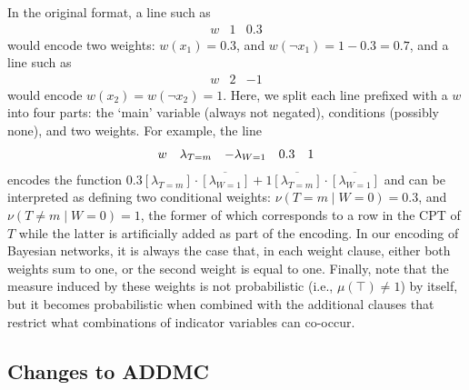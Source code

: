 In the original format, a line such as
\[
  \begin{array}{lrrll}
    w &1 &0.3
  \end{array}
\]
would encode two weights: $w(x_{1}) = 0.3$, and $w(\neg x_{1}) = 1 - 0.3 = 0.7$,
and a line such as
\[
  \begin{array}{lrrll}
    w &2 &-1
  \end{array}
\]
would encode $w(x_{2}) = w(\neg x_{2}) = 1$. Here, we split each line prefixed
with a $w$ into four parts: the `main' variable (always not negated), conditions
(possibly none), and two weights. For example, the line
\[
  \begin{array}{lrrll}
    w &\lambda\sb{T=m} &-\lambda\sb{W=1} &0.3 &1
  \end{array}
\]
encodes the function $0.3[\lambda_{T=m}] \cdot \overline{[\lambda_{W=1}]} +
1\overline{[\lambda_{T=m}]} \cdot \overline{[\lambda_{W=1}]}$ and can be
interpreted as defining two conditional weights: $\nu(T = m \mid W = 0) = 0.3$,
and $\nu(T \ne m \mid W = 0) = 1$, the former of which corresponds to a row in
the CPT of $T$ while the latter is artificially added as part of the encoding.
In our encoding of Bayesian networks, it is always the case that, in each weight
clause, either both weights sum to one, or the second weight is equal to one.
Finally, note that the measure induced by these weights is not probabilistic
(i.e., $\mu(\top) \ne 1$) by itself, but it becomes probabilistic when combined
with the additional clauses that restrict what combinations of indicator
variables can co-occur.

\subsection{Changes to \textsc{ADDMC}}

